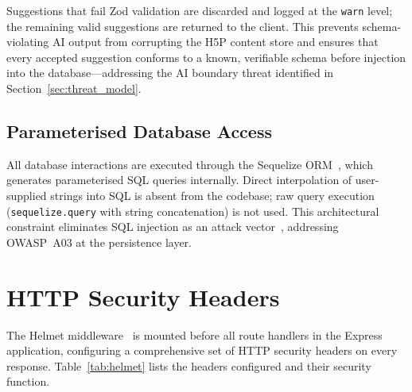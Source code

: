 Suggestions that fail Zod validation are discarded and logged at the
\texttt{warn} level; the remaining valid suggestions are returned to the
client. This prevents schema-violating AI output from corrupting the H5P
content store and ensures that every accepted suggestion conforms to a
known, verifiable schema before injection into the database---addressing
the AI boundary threat identified in Section~\ref{sec:threat_model}.

\subsection{Parameterised Database Access}

All database interactions are executed through the Sequelize
ORM~\cite{sequelize2023}, which generates parameterised SQL queries
internally. Direct interpolation of user-supplied strings into SQL is
absent from the codebase; raw query execution (\texttt{sequelize.query}
with string concatenation) is not used. This architectural constraint
eliminates SQL injection as an attack vector~\cite{owasp2021}, addressing
OWASP~A03 at the persistence layer.

\section{HTTP Security Headers}
\label{sec:headers}

The Helmet middleware~\cite{helmet2023} is mounted before all route handlers
in the Express application, configuring a comprehensive set of HTTP security
headers on every response. Table~\ref{tab:helmet} lists the headers
configured and their security function.

